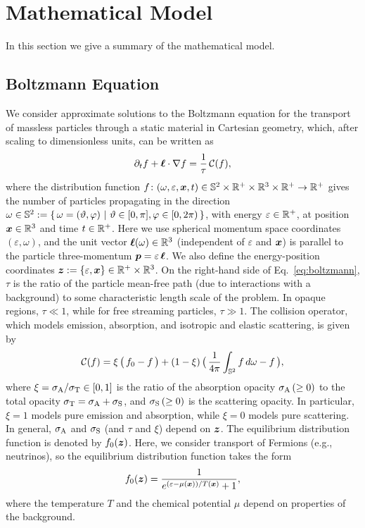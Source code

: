 \section{Mathematical Model}
\label{sec:model}

In this section we give a summary of the mathematical model.  

\subsection{Boltzmann Equation}

We consider approximate solutions to the Boltzmann equation for the transport of massless particles through a static material in Cartesian geometry, which, after scaling to dimensionless units, can be written as
\begin{equation}
  \pd{f}{t}+\vect{\ell}\cdot\nabla f
  =\f{1}{\tau}\,\cC(f),
  \label{eq:boltzmann}
\end{equation}
where the distribution function $f\colon(\omega,\varepsilon,\boldsymbol{x},t)\in\mathbb{S}^{2}\times\mathbb{R}^{+}\times\mathbb{R}^{3}\times\mathbb{R}^{+}\to\mathbb{R}^{+}$ gives the number of particles propagating in the direction $\omega\in\mathbb{S}^{2}:=\{\,\omega=(\vartheta,\varphi)~|~\vartheta\in[0,\pi],\varphi\in[0,2\pi)\,\}$, with energy $\varepsilon\in\mathbb{R}^{+}$, at position $\boldsymbol{x}\in\mathbb{R}^{3}$ and time $t\in\mathbb{R}^{+}$.  
Here we use spherical momentum space coordinates $(\varepsilon,\omega)$, and the unit vector $\boldsymbol{\ell}(\omega)\in\mathbb{R}^{3}$ (independent of $\varepsilon$ and $\boldsymbol{x}$) is parallel to the particle three-momentum $\boldsymbol{p}=\varepsilon\,\boldsymbol{\ell}$.  
We also define the energy-position coordinates $\boldsymbol{z}:=\{\varepsilon,\boldsymbol{x}\}\in\mathbb{R}^{+}\times\mathbb{R}^{3}$.  
On the right-hand side of Eq.~\eqref{eq:boltzmann}, $\tau$ is the ratio of the particle mean-free path (due to interactions with a background) to some characteristic length scale of the problem.  
In opaque regions, $\tau\ll1$, while for free streaming particles, $\tau\gg1$.  
The collision operator, which models emission, absorption, and isotropic and elastic scattering, is given by
\begin{equation}
  \cC(f)=\xi\,\big(\,f_{0}-f\,\big)
  +(1-\xi)\,\big(\,\f{1}{4\pi}\int_{\bbS^{2}}f\,d\omega-f\,\big),
  \label{eq:collisionTerm}
\end{equation}
where $\xi=\sigma_{{\rm A}}/\sigma_{{\rm T}}\in[0,1]$ is the ratio of the absorption opacity $\sigma_{{\rm A}}\,(\ge0)$ to the total opacity $\sigma_{{\rm T}}=\sigma_{{\rm A}}+\sigma_{{\rm S}}$, and $\sigma_{{\rm S}}\,(\ge0)$ is the scattering opacity.  
In particular, $\xi=1$ models pure emission and absorption, while $\xi=0$ models pure scattering.  
In general, $\sigma_{{\rm A}}$ and $\sigma_{{\rm S}}$ (and $\tau$ and $\xi$) depend on $\boldsymbol{z}$.  
The equilibrium distribution function is denoted by $f_{0}(\boldsymbol{z})$.  
Here, we consider transport of Fermions (e.g., neutrinos), so the equilibrium distribution function takes the form
\begin{equation}
  f_{0}(\vect{z})=\f{1}{e^{(\varepsilon-\mu(\vect{x}))/T(\vect{x})}+1},  
  \label{eq:fermiDirac}
\end{equation}
where the temperature $T$ and the chemical potential $\mu$ depend on properties of the background.  

